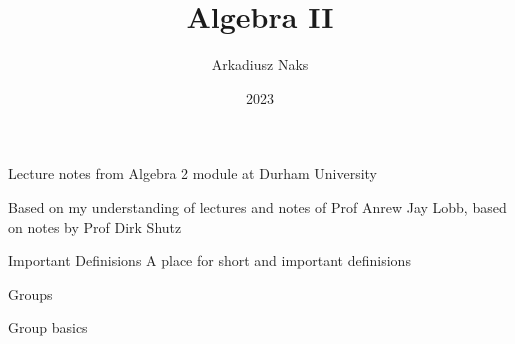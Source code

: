 \documentclass[12pt, letterpaper]{article}
\title{Algebra II}
\author{Arkadiusz Naks}
\date{2023}
\begin{document}
\begin{titlepage}
	\begin{center}
		\makeatletter
		\vspace*{1cm}
		\Huge
		\textbf{\@title}

		\vspace{0.5cm}
		\Large
		Lecture notes from Algebra 2 module at Durham University

		\vspace{1.5cm}

		\textbf{\@author}

		\vfill

		\vspace{0.8cm}

		\small
		Based on my understanding of lectures and notes of Prof Anrew Jay Lobb,
		based on notes by Prof Dirk Shutz\\
		\@date{}
	\end{center}
\end{titlepage}

\tableofcontents
\newpage

\begin{section}{Important Definisions}
 A place for short and important definisions
\end{section}

\begin{section}{Groups}
 \begin{subsection}{Group basics}

 \end{subsection}
\end{section}
\end{document}
